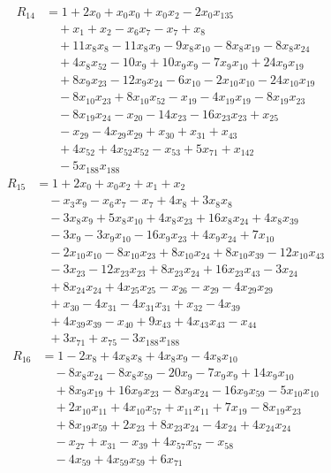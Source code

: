 \begin{align*}
R_{14}&={}1 +2x_{0} +x_{0}x_{0} +x_{0}x_{2} -2x_{0}x_{135}\\
&\quad{}+x_{1} +x_{2} -x_{6}x_{7} -x_{7} +x_{8}\\
&\quad{}+11x_{8}x_{8} -11x_{8}x_{9} -9x_{8}x_{10} -8x_{8}x_{19} -8x_{8}x_{24}\\
&\quad{}+4x_{8}x_{52} -10x_{9} +10x_{9}x_{9} -7x_{9}x_{10} +24x_{9}x_{19}\\
&\quad{}+8x_{9}x_{23} -12x_{9}x_{24} -6x_{10} -2x_{10}x_{10} -24x_{10}x_{19}\\
&\quad{}-8x_{10}x_{23} +8x_{10}x_{52} -x_{19} -4x_{19}x_{19} -8x_{19}x_{23}\\
&\quad{}-8x_{19}x_{24} -x_{20} -14x_{23} -16x_{23}x_{23} +x_{25}\\
&\quad{}-x_{29} -4x_{29}x_{29} +x_{30} +x_{31} +x_{43}\\
&\quad{}+4x_{52} +4x_{52}x_{52} -x_{53} +5x_{71} +x_{142}\\
&\quad{}-5x_{188}x_{188}
\end{align*}
\begin{align*}
R_{15}&={}1 +2x_{0} +x_{0}x_{2} +x_{1} +x_{2}\\
&\quad{}-x_{3}x_{9} -x_{6}x_{7} -x_{7} +4x_{8} +3x_{8}x_{8}\\
&\quad{}-3x_{8}x_{9} +5x_{8}x_{10} +4x_{8}x_{23} +16x_{8}x_{24} +4x_{8}x_{39}\\
&\quad{}-3x_{9} -3x_{9}x_{10} -16x_{9}x_{23} +4x_{9}x_{24} +7x_{10}\\
&\quad{}-2x_{10}x_{10} -8x_{10}x_{23} +8x_{10}x_{24} +8x_{10}x_{39} -12x_{10}x_{43}\\
&\quad{}-3x_{23} -12x_{23}x_{23} +8x_{23}x_{24} +16x_{23}x_{43} -3x_{24}\\
&\quad{}+8x_{24}x_{24} +4x_{25}x_{25} -x_{26} -x_{29} -4x_{29}x_{29}\\
&\quad{}+x_{30} -4x_{31} -4x_{31}x_{31} +x_{32} -4x_{39}\\
&\quad{}+4x_{39}x_{39} -x_{40} +9x_{43} +4x_{43}x_{43} -x_{44}\\
&\quad{}+3x_{71} +x_{75} -3x_{188}x_{188}
\end{align*}
\begin{align*}
R_{16}&={}1 -2x_{8} +4x_{8}x_{8} +4x_{8}x_{9} -4x_{8}x_{10}\\
&\quad{}-8x_{8}x_{24} -8x_{8}x_{59} -20x_{9} -7x_{9}x_{9} +14x_{9}x_{10}\\
&\quad{}+8x_{9}x_{19} +16x_{9}x_{23} -8x_{9}x_{24} -16x_{9}x_{59} -5x_{10}x_{10}\\
&\quad{}+2x_{10}x_{11} +4x_{10}x_{57} +x_{11}x_{11} +7x_{19} -8x_{19}x_{23}\\
&\quad{}+8x_{19}x_{59} +2x_{23} +8x_{23}x_{24} -4x_{24} +4x_{24}x_{24}\\
&\quad{}-x_{27} +x_{31} -x_{39} +4x_{57}x_{57} -x_{58}\\
&\quad{}-4x_{59} +4x_{59}x_{59} +6x_{71}
\end{align*}
